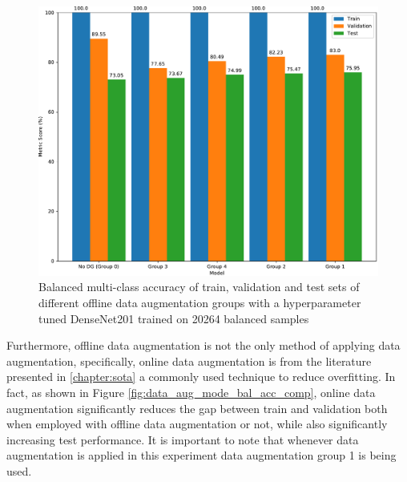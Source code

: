     \begin{figure}[ht]
        \centering
        \includegraphics[width=\textwidth]{figs/data_aug_group_bal_acc_comp.pdf}
        \caption{Balanced multi-class accuracy of train, validation and test sets of different offline data augmentation groups with a hyperparameter tuned DenseNet201 trained on 20264 balanced samples}
        \label{fig:data_aug_group_bal_acc_comp}
    \end{figure}
    
    Furthermore, offline data augmentation is not the only method of applying data augmentation, specifically, online data augmentation is from the literature presented in \autoref{chapter:sota} a commonly used technique to reduce overfitting. In fact, as shown in Figure \ref{fig:data_aug_mode_bal_acc_comp}, online data augmentation significantly reduces the gap between train and validation both when employed with offline data augmentation or not, while also significantly increasing test performance. It is important to note that whenever data augmentation is applied in this experiment data augmentation group 1 is being used. \par
    
